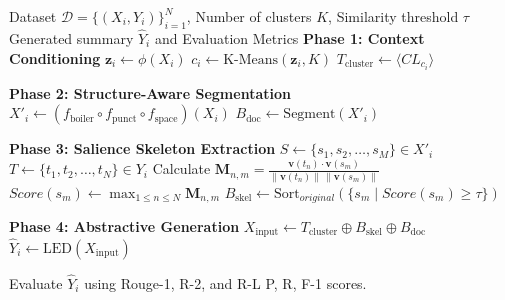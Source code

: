 \documentclass[11pt, a4paper]{article}
\theoremstyle{plain}%
\theoremstyle{remark}%
\theoremstyle{definition}%
\begin{document}
\begin{algorithm}[H]
\caption{Mathematical Procedure of the Proposed CSS-LED Model}
\label{alg:proposed_algorithm}
\begin{algorithmic}[1]
\Require Dataset $\mathcal{D} = \{(X_i, Y_i)\}_{i=1}^{N}$, Number of clusters $K$, Similarity threshold $\tau$
\Ensure Generated summary $\hat{Y}_i$ and Evaluation Metrics
    \vspace{2pt}
    \State \textbf{Phase 1: Context Conditioning}
    \State $\mathbf{z}_i \gets \phi(X_i)$ 
    \State $c_i \gets \text{K-Means}(\mathbf{z}_i, K)$ 
    \State $T_{\text{cluster}} \gets \langle CL_{c_i} \rangle$ 
    \vspace{2pt}

    \State \textbf{Phase 2: Structure-Aware Segmentation}
    \State $X'_i \gets (f_{\text{boiler}} \circ f_{\text{punct}} \circ f_{\text{space}})(X_i)$ 
    \State $B_{\text{doc}} \gets \text{Segment}(X'_i)$ 
    \vspace{2pt}

    \State \textbf{Phase 3: Salience Skeleton Extraction}
    \State $S \gets \{s_1, s_2, \dots, s_M\} \in X'_i$ 
    \State $T \gets \{t_1, t_2, \dots, t_N\} \in Y_i$ 
    \State Calculate $\mathbf{M}_{n,m} = \frac{\mathbf{v}(t_n) \cdot \mathbf{v}(s_m)}{\|\mathbf{v}(t_n)\| \, \|\mathbf{v}(s_m)\|}$ 
    \State $Score(s_m) \gets \max_{1 \leq n \leq N} \mathbf{M}_{n,m}$
    \State $B_{\text{skel}} \gets \text{Sort}_{original}(\{s_m \mid Score(s_m) \geq \tau\})$ 
    \vspace{2pt}

    \State \textbf{Phase 4: Abstractive Generation}
    \State $X_{\text{input}} \gets T_{\text{cluster}} \oplus B_{\text{skel}} \oplus B_{\text{doc}}$ 
    \State $\hat{Y}_i \gets \text{LED}(X_{\text{input}})$ 
\EndFor

\State Evaluate $\hat{Y}_i$ using Rouge-1, R-2, and R-L P, R, F-1 scores.
\end{algorithmic}
\end{algorithm}
\end{document}
